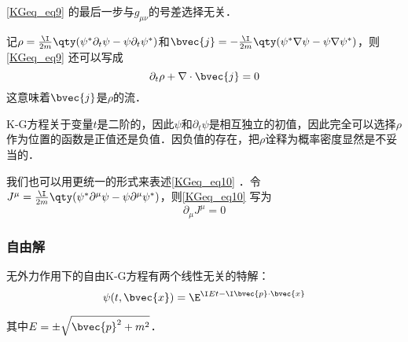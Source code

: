 \autoref{KGeq_eq9} 的最后一步与$g_{\mu\nu}$的号差选择无关．

记$\rho=\frac{\I}{2m}\qty(\psi^*\partial_t\psi-\psi\partial_t\psi^*)$和$\bvec{j}=-\frac{\I}{2m}\qty(\psi^*\nabla\psi-\psi\nabla\psi^*)$，则\autoref{KGeq_eq9} 还可以写成
\begin{equation}\label{KGeq_eq10}
\partial_t\rho+\nabla\cdot\bvec{j} = 0
\end{equation}
这意味着$\bvec{j}$是$\rho$的流．

K-G方程关于变量$t$是二阶的，因此$\psi$和$\partial_t\psi$是相互独立的初值，因此完全可以选择$\rho$作为位置的函数是正值还是负值．因负值的存在，把$\rho$诠释为概率密度显然是不妥当的．

我们也可以用更统一的形式来表述\autoref{KGeq_eq10} ．令$J^\mu=\frac{\I}{2m}\qty(\psi^*\partial^\mu\psi-\psi\partial^\mu\psi^*)$，则\autoref{KGeq_eq10} 写为
\begin{equation}
\partial_\mu J^\mu = 0
\end{equation}



\subsubsection{自由解}

无外力作用下的自由K-G方程有两个线性无关的特解：
\begin{equation}
\psi(t, \bvec{x}) = \E^{\I Et-\I \bvec{p}\cdot\bvec{x}}
\end{equation}

其中$E=\pm\sqrt{\bvec{p}^2+m^2}$．



















